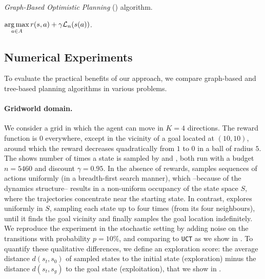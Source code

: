 \begin{algorithm}[ht]
	\caption{\emph{Graph-Based Optimistic Planning} (\GBOP) algorithm.}
	\label{alg:gbop}
	\DontPrintSemicolon
	\Return $\displaystyle\operatorname*{arg\,max}_{a\in A} r(s,a) + \gamma \mathcal{L}_n(s(a))$. 
\end{algorithm}

\subsection{Numerical Experiments}
\label{sec:experiments}

To evaluate the practical benefits of our approach, we compare graph-based and tree-based planning algorithms in various problems.

\paragraph{Gridworld domain.}
We consider a grid in which the agent can move in $K=4$ directions. The reward function is $0$ everywhere, except in the vicinity of a goal located at $(10, 10)$, around which the reward decreases quadratically from $1$ to $0$ in a ball of radius $5$. %
The  shows number of times a state is sampled by \OPD and \GBOPD, both run with a budget $n = 5460$ and discount $\gamma=0.95$. In the absence of rewards, \OPD samples sequences of actions uniformly (in a breadth-first search manner), which --because of the dynamics structure-- results in a non-uniform occupancy of the state space $S$, where the trajectories concentrate near the starting state. In contrast, \GBOPD explores uniformly in $S$, sampling each state up to four times (from its four  neighbours), until it finds the goal vicinity and finally samples the goal location indefinitely. We reproduce the experiment in the stochastic setting by adding noise on the transitions with probability $p=10\%$, and comparing \GBOP to \texttt{UCT} as we show in . To quantify these qualitative differences, we define an exploration score: the average distance $d(s_t, s_0)$ of sampled states to the initial state (exploration) minus the distance $d(s_t, s_g)$ to the goal state (exploitation), that we show in .

